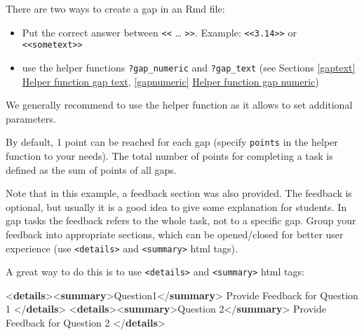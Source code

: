 \documentclass[twoside]{tufte-book}
\newenvironment{Shaded}{}{}
\newcommand{\DataTypeTok}[1]{\textcolor[rgb]{0.56,0.13,0.00}{#1}}
\newcommand{\KeywordTok}[1]{\textcolor[rgb]{0.00,0.44,0.13}{\textbf{#1}}}
\newcommand{\NormalTok}[1]{#1}
\providecommand{\tightlist}{%
  \setlength{\itemsep}{0pt}\setlength{\parskip}{0pt}}
\begin{document}
There are two ways to create a gap in an Rmd file:

\begin{itemize}
\tightlist
\item
  Put the correct answer between \texttt{\textless{}\textless{}} \ldots{} \texttt{\textgreater{}\textgreater{}}. Example: \texttt{\textless{}\textless{}3.14\textgreater{}\textgreater{}} or \texttt{\textless{}\textless{}sometext\textgreater{}\textgreater{}}
\item
  use the helper functions \texttt{?gap\_numeric} and \texttt{?gap\_text} (see Sections \ref{gaptext} \hyperref[gaptext]{Helper function gap text}, \ref{gapnumeric} \hyperref[gapnumeric]{Helper function gap numeric})
\end{itemize}

We generally recommend to use the helper function as it allows to set additional parameters.

By default, 1 point can be reached for each gap (specify \texttt{points} in the helper function to your needs). The total number of points for completing a task is defined as the sum of points of all gaps.

Note that in this example, a feedback section was also provided. The feedback is
optional, but usually it is a good idea to give some explanation for students. In gap tasks the feedback refers to the whole task, not to a specific gap. Group your feedback into appropriate sections, which can be opened/closed for better user experience (use \texttt{\textless{}details\textgreater{}} and \texttt{\textless{}summary\textgreater{}} html tags).

A great way to do this is to use \texttt{\textless{}details\textgreater{}} and \texttt{\textless{}summary\textgreater{}} html tags:

\begin{Shaded}
\begin{Highlighting}[]
\DataTypeTok{\textless{}}\KeywordTok{details}\DataTypeTok{\textgreater{}\textless{}}\KeywordTok{summary}\DataTypeTok{\textgreater{}}\NormalTok{Question1}\DataTypeTok{\textless{}/}\KeywordTok{summary}\DataTypeTok{\textgreater{}}
\NormalTok{  Provide Feedback for Question 1}
\DataTypeTok{\textless{}/}\KeywordTok{details}\DataTypeTok{\textgreater{}}
\DataTypeTok{\textless{}}\KeywordTok{details}\DataTypeTok{\textgreater{}\textless{}}\KeywordTok{summary}\DataTypeTok{\textgreater{}}\NormalTok{Question 2}\DataTypeTok{\textless{}/}\KeywordTok{summary}\DataTypeTok{\textgreater{}}
\NormalTok{  Provide Feedback for Question 2}
\DataTypeTok{\textless{}/}\KeywordTok{details}\DataTypeTok{\textgreater{}}
\end{Highlighting}
\end{Shaded}
\end{document}
